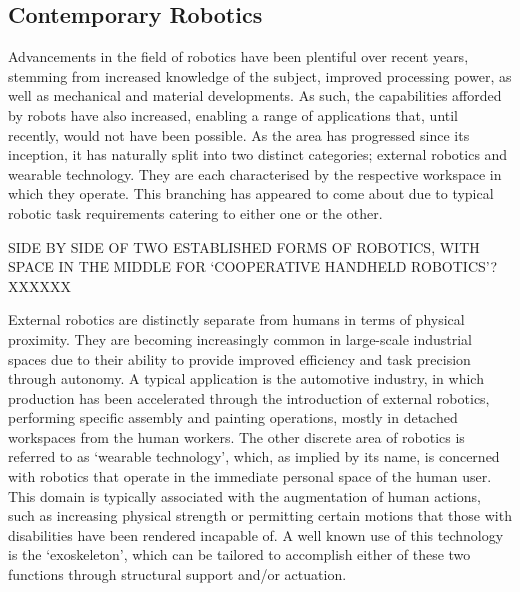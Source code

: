 \documentclass[11pt]{article}
\begin{document}
\subsection{Contemporary Robotics}
Advancements in the field of robotics have been plentiful over recent years, stemming from increased knowledge of the subject, improved processing power, as well as mechanical and material developments. As such, the capabilities afforded by robots have also increased, enabling a range of applications that, until recently, would not have been possible. As the area has progressed since its inception, it has naturally split into two distinct categories; external robotics and wearable technology. They are each characterised by the respective workspace in which they operate. This branching has appeared to come about due to typical robotic task requirements catering to either one or the other.

SIDE BY SIDE OF TWO ESTABLISHED FORMS OF ROBOTICS, WITH SPACE IN THE MIDDLE FOR `COOPERATIVE HANDHELD ROBOTICS'? XXXXXX

External robotics are distinctly separate from humans in terms of physical proximity. They are becoming increasingly common in large-scale industrial spaces due to their ability to provide improved efficiency and task precision through autonomy. A typical application is the automotive industry, in which production has been accelerated through the introduction of external robotics, performing specific assembly and painting operations, mostly in detached workspaces from the human workers. The other discrete area of robotics is referred to as `wearable technology', which, as implied by its name, is concerned with robotics that operate in the immediate personal space of the human user. This domain is typically associated with the augmentation of human actions, such as increasing physical strength or permitting certain motions that those with disabilities have been rendered incapable of. A well known use of this technology is the `exoskeleton', which can be tailored to accomplish either of these two functions through structural support and/or actuation.
\end{document}
